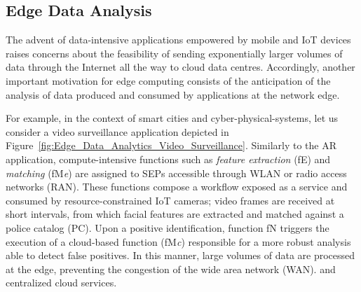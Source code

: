 \subsection{Edge Data Analysis}\label{sec:SEP_EDA}

The advent of data-intensive applications empowered by mobile and IoT devices raises concerns about the feasibility of sending exponentially larger volumes of data through the Internet all the way to cloud data centres. Accordingly, another important motivation for edge computing consists of the anticipation of the analysis of data produced and consumed by applications at the network edge. 



For example, in the context of smart cities and cyber-physical-systems, let us consider a video surveillance application 
depicted in Figure~\ref{fig:Edge_Data_Analytics_Video_Surveillance}. Similarly to the AR application, compute-intensive functions such as \textit{feature extraction} (fE) and \textit{matching} (fM\textit{e}) are assigned to SEPs accessible through WLAN or radio access networks (RAN).
These functions compose a workflow exposed as a service and consumed by resource-constrained IoT cameras; video frames are received at short intervals, from which facial features are extracted and matched against a police catalog (PC). Upon a positive identification, function fN triggers the execution of a cloud-based function (fM\textit{c}) responsible for a more robust analysis able to detect false positives. In this manner, large volumes of data are processed at the edge, preventing the congestion of the wide area network (WAN). and centralized cloud services.


